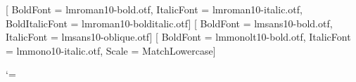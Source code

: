 %
%
%
\setmainfont{lmroman10-regular.otf}[
  BoldFont       = lmroman10-bold.otf,
  ItalicFont     = lmroman10-italic.otf,
  BoldItalicFont = lmroman10-bolditalic.otf]
\setsansfont{lmsans10-regular.otf}[
  BoldFont   = lmsans10-bold.otf,
  ItalicFont = lmsans10-oblique.otf]
\setmonofont{lmmono10-regular.otf}[
  BoldFont   = lmmonolt10-bold.otf,
  ItalicFont = lmmono10-italic.otf,
  Scale      = MatchLowercase]

%
\newfontfamily{}
\catcode`\α=\active {}
